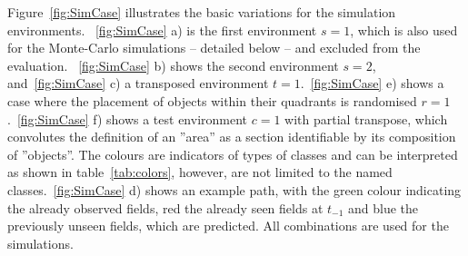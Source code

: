 \documentclass[twocolumn,letterpaper]{IEEEAerospaceCLS}  %
\begin{document}
Figure~\ref{fig:SimCase} illustrates the basic variations for the simulation environments. ~\ref{fig:SimCase} a) is the first environment $s=1$, which is also used for the Monte-Carlo simulations -- detailed below --  and excluded from the evaluation. ~\ref{fig:SimCase} b) shows the second environment $s=2$, and~\ref{fig:SimCase} c) a transposed environment $t=1$.~\ref{fig:SimCase} e) shows a case where the placement of objects within their quadrants is randomised $r=1$.~\ref{fig:SimCase} f) shows a test environment $c=1$ with partial transpose, which convolutes the definition of an ''area'' as a section identifiable by its composition of ''objects''. The colours are indicators of types of classes and can be interpreted as shown in table~\ref{tab:colors}, however, are not limited to the named classes.~\ref{fig:SimCase} d) shows an example path, with the green colour indicating the already observed fields, red the already seen fields at $t_{-1}$ and blue the previously unseen fields, which are predicted. All combinations are used for the simulations.
\end{document}

